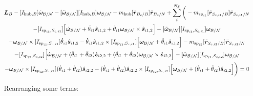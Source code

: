 \documentclass[paper]{aiaaNew}
\begin{document}
\begin{multline}
\bm L_B -[I_{\text{hub},B}] \dot{\bm\omega}_{\cal B/N}  -[\bm{\tilde{\omega}}_{\cal B/N}] [I_{\text{hub},B}] \bm\omega_{\cal B/N} - m_{\text{hub}} [\tilde{{\bm r}}_{B_c/B}] \ddot{\bm r}_{B_c/N}
+ \sum\limits_{i}^{N_S}\bigg(- m_{\text{sp}_{i1}} [\tilde{{\bm r}}_{S_{c,i1}/B}] \ddot{\bm r}_{S_{c,i1}/N} \\
-[I_{\text{sp}_{i1},S_{c,i1}}] \Big[\dot{\bm \omega}_{\cal{B/N}} + \ddot{\theta}_{i1} \hat{\bm s}_{i1,2} + \dot{\theta}_{i1} \bm \omega_{\cal{B/N}} \times \hat{\bm s}_{i1,2}\Big]  
-[\tilde{\bm \omega}_{\cal{B/N}}] [I_{\text{sp}_{i1},S_{c,i1}}] \bm \omega_{\cal{B/N}} \\
-\bm \omega_{\cal{B/N}} \times [I_{\text{sp}_{i1},S_{c,i1}}] \dot{\theta}_{i1} \hat{\bm s}_{i1,2} -\dot{\theta}_{i1} \hat{\bm s}_{i1,2} \times [I_{\text{sp}_{i1},S_{c,i1}}] \Big[\bm \omega_{\cal{B/N}} + \dot{\theta}_{i1} \hat{\bm s}_{i1,2}\Big]
- m_{\text{sp}_{i2}} [\tilde{{\bm r}}_{S_{c,i2}/B}] \ddot{\bm r}_{S_{c,i2}/N} \\
-[I_{\text{sp}_{i2},S_{c,i2}}] \Big[\dot{\bm \omega}_{\cal{B/N}} + (\ddot{\theta}_{i1}  + \ddot{\theta}_{i2})\hat{\bm s}_{i2,2} + (\dot{\theta}_{i1}  + \dot{\theta}_{i2}) \bm \omega_{\cal{B/N}} \times \hat{\bm s}_{i2,2}\Big]  
-[\tilde{\bm \omega}_{\cal{B/N}}] [I_{\text{sp}_{i2},S_{c,i2}}] \bm \omega_{\cal{B/N}} \\
-\bm \omega_{\cal{B/N}} \times [I_{\text{sp}_{i2},S_{c,i2}}] (\dot{\theta}_{i1}  + \dot{\theta}_{i2})\hat{\bm s}_{i2,2} -(\dot{\theta}_{i1}  + \dot{\theta}_{i2})\hat{\bm s}_{i2,2} \times [I_{\text{sp}_{i2},S_{c,i2}}] \Big[\bm \omega_{\cal{B/N}} + (\dot{\theta}_{i1}  + \dot{\theta}_{i2})\hat{\bm s}_{i2,2}\Big]\bigg) = 0
\end{multline}

Rearranging some terms:
\end{document}
